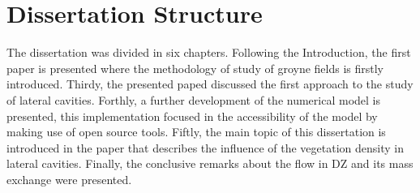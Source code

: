 \section{Dissertation Structure}
The dissertation was divided in six chapters. Following the Introduction, the first paper is presented where the methodology of study of groyne fields is firstly introduced. Thirdy, the presented paped discussed the first approach to the study of lateral cavities. Forthly, a further development of the numerical model is presented, this implementation focused in the accessibility of the model by making use of open source tools. Fiftly, the main topic of this dissertation is introduced in the paper that describes the influence of the vegetation density in lateral cavities. Finally, the conclusive remarks about the flow in DZ and its mass exchange were presented.

